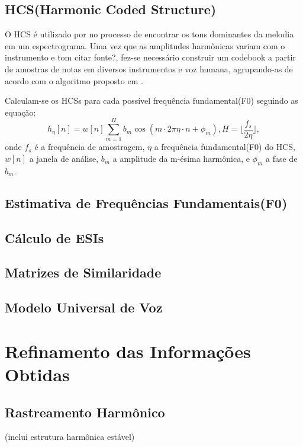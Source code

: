 \documentclass[
	12pt,				%
	openright,			%
	oneside,			%
	a4paper,			%
	english,			%
	brazil,				%
	]{abntex2}
\begin{document}
\subsection{HCS(Harmonic Coded Structure)}
O HCS é utilizado por  no processo de encontrar os tons dominantes da melodia em um espectrograma. Uma vez que as amplitudes harmônicas variam com o instrumento e tom \textsf{citar fonte?}, fez-se necessário construir um codebook a partir de amostras de notas em diversos instrumentos e voz humana, agrupando-as de acordo com o algoritmo proposto em \cite{PellegM2000}.

Calculam-se os HCSs para cada possível frequência fundamental(F0) seguindo as equação:
\begin{equation}
    h_\eta [n] = w[n] \displaystyle\sum_{m = 1}^H b_m \cos(m \cdot 2\pi \eta \cdot n + \phi_m), H = \lfloor \frac{f_s}{2\eta} \rfloor, 
\end{equation}
onde $f_s$ é a frequência de amostragem, $\eta$ a frequência fundamental(F0) do HCS, $w[n]$ a janela de análise, $b_m$ a amplitude da m-ésima harmônica, e $\phi_m$ a fase de $b_m$.

\subsection{Estimativa de Frequências Fundamentais(F0)}

\subsection{Cálculo de ESIs}

\subsection{Matrizes de Similaridade}

\subsection{Modelo Universal de Voz}

\section{Refinamento das Informações Obtidas}
\subsection{Rastreamento Harmônico}
\textsf{(inclui estrutura harmônica estável)}
\end{document}
